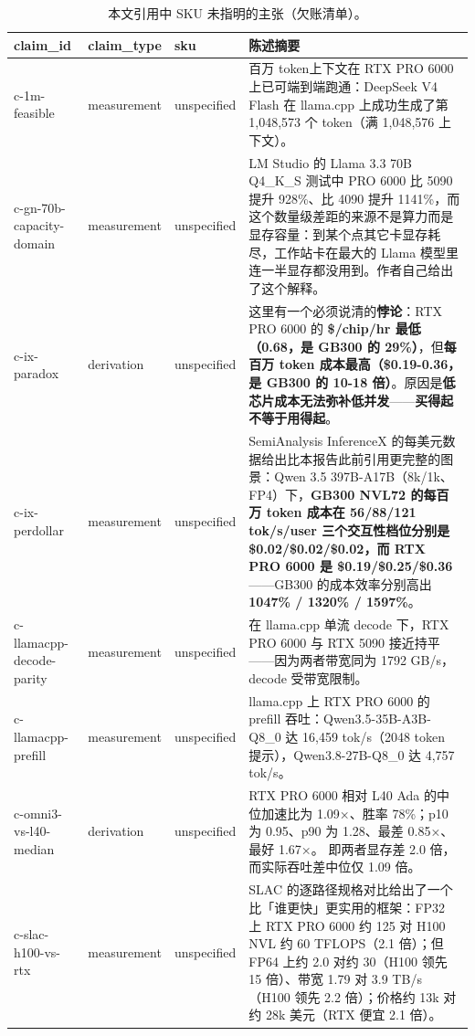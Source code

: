 \begin{table}[t]
\centering
\footnotesize
\setlength{\tabcolsep}{4pt}
\caption{本文引用中 SKU 未指明的主张（欠账清单）。}
\label{tab:2}
\begin{tabularx}{\textwidth}{XllX}
\toprule
claim\_id & claim\_type & sku & 陈述摘要 \\
\midrule
c-1m-feasible & measurement & unspecified & 百万 token上下文在 RTX PRO 6000 上已可端到端跑通：DeepSeek V4 Flash 在 llama.cpp 上成功生成了第 1,048,573 个 token（满 1,048,576 上下文）。 \\
c-gn-70b-capacity-domain & measurement & unspecified & LM Studio 的 Llama 3.3 70B Q4\_K\_S 测试中 PRO 6000 比 5090 提升 928\%、比 4090 提升 1141\%，而这个数量级差距的来源不是算力而是显存容量：到某个点其它卡显存耗尽，工作站卡在最大的 Llama 模型里连一半显存都没用到。作者自己给出了这个解释。 \\
c-ix-paradox & derivation & unspecified & 这里有一个必须说清的\textbf{悖论}：RTX PRO 6000 的 \textbf{\$/chip/hr 最低（0.68，是 GB300 的 29\%）}，但\textbf{每百万 token 成本最高（\$0.19-\hspace{0pt}0.36，是 GB300 的 10-\hspace{0pt}18 倍）}。原因是\textbf{低芯片成本无法弥补低并发}——\textbf{买得起不等于用得起}。 \\
c-ix-perdollar & measurement & unspecified & SemiAnalysis InferenceX 的每美元数据给出比本报告此前引用更完整的图景：Qwen 3.5 397B-A17B（8k/1k、FP4）下，\textbf{GB300 NVL72 的每百万 token 成本在 56/88/121 tok/s/user 三个交互性档位分别是 \$0.02/\$0.02/\$0.02，而 RTX PRO 6000 是 \$0.19/\$0.25/\$0.36}——GB300 的成本效率分别高出 \textbf{1047\% / 1320\% / 1597\%}。 \\
c-llamacpp-decode-parity & measurement & unspecified & 在 llama.cpp 单流 decode 下，RTX PRO 6000 与 RTX 5090 接近持平——因为两者带宽同为 1792 GB/s，decode 受带宽限制。 \\
c-llamacpp-prefill & measurement & unspecified & llama.cpp 上 RTX PRO 6000 的 prefill 吞吐：Qwen3.5-35B-A3B-Q8\_0 达 16,459 tok/s（2048 token 提示），Qwen3.8-27B-Q8\_0 达 4,757 tok/s。 \\
c-omni3-vs-l40-median & derivation & unspecified & \sym{⭐}{} RTX PRO 6000 相对 L40 Ada 的中位加速比为 1.09×、胜率 78\%；p10 为 0.95、p90 为 1.28、最差 0.85×、最好 1.67×。\sym{⚠}{} 即两者显存差 2.0 倍，而实际吞吐差中位仅 1.09 倍。 \\
c-slac-h100-vs-rtx & measurement & unspecified & \sym{⭐}{} SLAC 的逐路径规格对比给出了一个比「谁更快」更实用的框架：FP32 上 RTX PRO 6000 约 125 对 H100 NVL 约 60 TFLOPS（2.1 倍）；但 FP64 上约 2.0 对约 30（H100 领先 15 倍）、带宽 1.79 对 3.9 TB/s（H100 领先 2.2 倍）；价格约 13k 对约 28k 美元（RTX 便宜 2.1 倍）。 \\

\end{tabularx}
\end{table}
